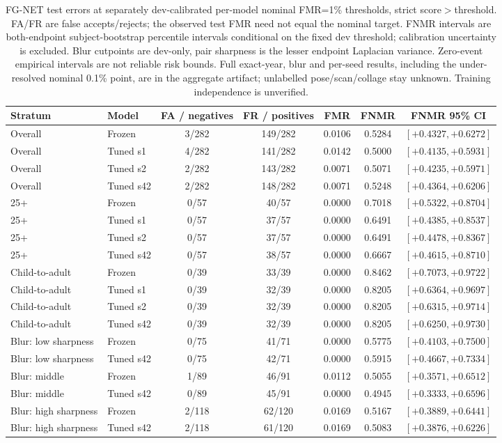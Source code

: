 \documentclass[journal]{IEEEtran}
\begin{document}
\begin{table}[!t]
\caption{FG-NET test errors at separately dev-calibrated per-model nominal FMR=1\% thresholds, strict score$>$threshold. FA/FR are false accepts/rejects; the observed test FMR need not equal the nominal target. FNMR intervals are both-endpoint subject-bootstrap percentile intervals conditional on the fixed dev threshold; calibration uncertainty is excluded. Blur cutpoints are dev-only, pair sharpness is the lesser endpoint Laplacian variance. Zero-event empirical intervals are not reliable risk bounds. Full exact-year, blur and per-seed results, including the under-resolved nominal 0.1\% point, are in the aggregate artifact; unlabelled pose/scan/collage stay unknown. Training independence is unverified.}
\label{tab:fgnet-errors}
\centering\footnotesize
\begin{tabular}{@{}llccccc@{}}
\toprule
Stratum & Model & FA / negatives & FR / positives & FMR & FNMR & FNMR 95\% CI \\
\midrule
Overall & Frozen & 3/282 & 149/282 & 0.0106 & 0.5284 & $[+0.4327,+0.6272]$ \\
Overall & Tuned s1 & 4/282 & 141/282 & 0.0142 & 0.5000 & $[+0.4135,+0.5931]$ \\
Overall & Tuned s2 & 2/282 & 143/282 & 0.0071 & 0.5071 & $[+0.4235,+0.5971]$ \\
Overall & Tuned s42 & 2/282 & 148/282 & 0.0071 & 0.5248 & $[+0.4364,+0.6206]$ \\
25+ & Frozen & 0/57 & 40/57 & 0.0000 & 0.7018 & $[+0.5322,+0.8704]$ \\
25+ & Tuned s1 & 0/57 & 37/57 & 0.0000 & 0.6491 & $[+0.4385,+0.8537]$ \\
25+ & Tuned s2 & 0/57 & 37/57 & 0.0000 & 0.6491 & $[+0.4478,+0.8367]$ \\
25+ & Tuned s42 & 0/57 & 38/57 & 0.0000 & 0.6667 & $[+0.4615,+0.8710]$ \\
Child-to-adult & Frozen & 0/39 & 33/39 & 0.0000 & 0.8462 & $[+0.7073,+0.9722]$ \\
Child-to-adult & Tuned s1 & 0/39 & 32/39 & 0.0000 & 0.8205 & $[+0.6364,+0.9697]$ \\
Child-to-adult & Tuned s2 & 0/39 & 32/39 & 0.0000 & 0.8205 & $[+0.6315,+0.9714]$ \\
Child-to-adult & Tuned s42 & 0/39 & 32/39 & 0.0000 & 0.8205 & $[+0.6250,+0.9730]$ \\
Blur: low sharpness & Frozen & 0/75 & 41/71 & 0.0000 & 0.5775 & $[+0.4103,+0.7500]$ \\
Blur: low sharpness & Tuned s42 & 0/75 & 42/71 & 0.0000 & 0.5915 & $[+0.4667,+0.7334]$ \\
Blur: middle & Frozen & 1/89 & 46/91 & 0.0112 & 0.5055 & $[+0.3571,+0.6512]$ \\
Blur: middle & Tuned s42 & 0/89 & 45/91 & 0.0000 & 0.4945 & $[+0.3333,+0.6596]$ \\
Blur: high sharpness & Frozen & 2/118 & 62/120 & 0.0169 & 0.5167 & $[+0.3889,+0.6441]$ \\
Blur: high sharpness & Tuned s42 & 2/118 & 61/120 & 0.0169 & 0.5083 & $[+0.3876,+0.6226]$ \\
\bottomrule
\end{tabular}
\end{table}
\end{document}

